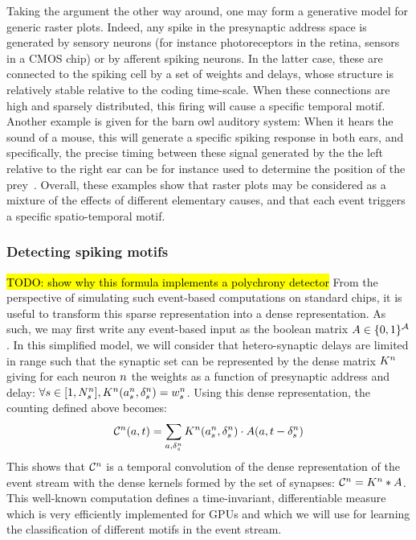 \documentclass[default]{sn-jnl}%
\theoremstyle{thmstyleone}%
\theoremstyle{thmstyletwo}%
\theoremstyle{thmstylethree}%
\newcommand{\note}[1]{{\sethlcolor{yellow}\hl{#1}}}
\begin{document}
Taking the argument the other way around, one may form a generative model for generic raster plots. Indeed, any spike in the presynaptic address space is generated by sensory neurons (for instance photoreceptors in the retina, sensors in a CMOS chip) or by afferent spiking neurons. In the latter case, these are connected to the spiking cell by a set of weights and delays, whose structure is relatively stable relative to the coding time-scale. When these connections are high and sparsely distributed, this firing will cause a specific temporal motif. Another example is given for the barn owl auditory system: When it hears the sound of a mouse, this will generate a specific spiking response in both ears, and specifically, the precise timing between these signal generated by the the left relative to the right ear can be for instance used to determine the position of the prey~\citep{goodman_spike-timing-based_2010}. Overall, these examples show that raster plots may be considered as a mixture of the effects of different elementary causes, and that each event triggers a specific spatio-temporal motif. 
%
\subsubsection{Detecting spiking motifs}

\note{ TODO: show why this formula implements a polychrony detector }
From the perspective of simulating such event-based computations on standard chips, it is useful to transform this sparse representation into a dense representation. As such, we may first write any event-based input as the boolean matrix $A \in \{0, 1 \}^{\mathcal{A}}$. In this simplified model, we will consider that hetero-synaptic delays are limited in range such that the synaptic set can be represented by the dense matrix $K^n$ giving for each neuron $n$ the weights as a function of presynaptic address and delay: $\forall {s\in [1,N_{s}^n]}, K^n(a_s^n, \delta_s^n) = w_s^n$. 
Using this dense representation, the counting defined above becomes:
\begin{equation*}
\mathcal{C}^n(a,t)
= \sum_{a, \delta_s^n} K^n(a_s^n, \delta_s^n) \cdot A(a, t-\delta_s^n)
\end{equation*}
%
This shows that $\mathcal{C}^n$ is a temporal convolution of the dense representation of the event stream with the dense kernels formed by the set of synapses:  $\mathcal{C}^n = K^n \ast A$.
This well-known computation defines a time-invariant, differentiable measure which is very efficiently implemented for GPUs and which we will use for learning the classification of different motifs in the event stream.
%
\end{document}
